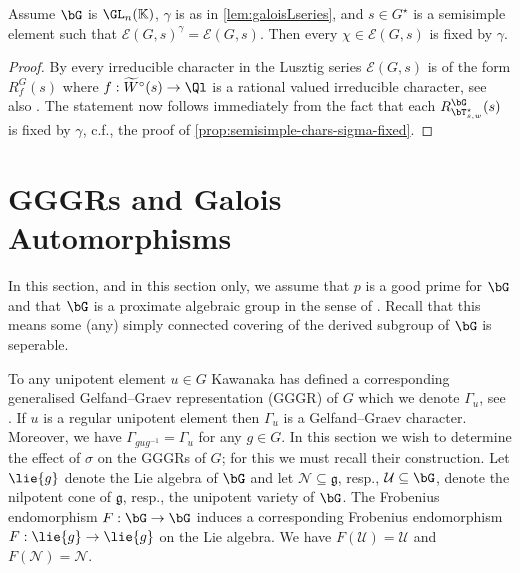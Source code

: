\documentclass[eqthmnum, nocolour]{jt-calcs}
\begin{document}
\begin{prop}\label{prop:GLn-sigma-fixed}
Assume $\bG$ is $\GL_n(\mathbb{K})$, $\gamma$ is as in \cref{lem:galoisLseries}, and $s \in G^{\star}$ is a semisimple element such that $\mathcal{E}(G,s)^{\gamma} = \mathcal{E}(G,s)$.  Then every $\chi \in \mathcal{E}(G,s)$ is fixed by $\gamma$.
\end{prop}

\begin{proof}
By \cite[3.2, 4.23]{lusztig:1984:characters-of-reductive-groups} every irreducible character in the Lusztig series $\mathcal{E}(G,s)$ is of the form $R^G_f(s)$ where $f : \widetilde{W}^{\circ}(s) \to \Ql$ is a rational valued irreducible character, see also \cite[13.25(ii), \S15.4]{digne-michel:1991:representations-of-finite-groups-of-lie-type}. The statement now follows immediately from the fact that each $R_{\bT_{s,w}^{\star}}^{\bG}(s)$ is fixed by $\gamma$, c.f., the proof of \cref{prop:semisimple-chars-sigma-fixed}.
\end{proof}

\section{GGGRs and Galois Automorphisms}\label{sec:GGGRs}
\begin{assumption}
In this section, and in this section only, we assume that $p$ is a good prime for $\bG$ and that $\bG$ is a proximate algebraic group in the sense of \cite[2.10]{taylor:2016:GGGRs-small-characteristics}. Recall that this means some (any) simply connected covering of the derived subgroup of $\bG$ is seperable.
\end{assumption}

\begin{pa}\label{pa:GGGR-rat-conj}
To any unipotent element $u \in G$ Kawanaka has defined a corresponding generalised Gelfand--Graev representation (GGGR) of $G$ which we denote $\Gamma_u$, see \cite{kawanaka:1985:GGGRs-and-ennola-duality,taylor:2016:GGGRs-small-characteristics}. If $u$ is a regular unipotent element then $\Gamma_u$ is a Gelfand--Graev character. Moreover, we have $\Gamma_{gug^{-1}} = \Gamma_u$ for any $g \in G$. In this section we wish to determine the effect of $\sigma$ on the GGGRs of $G$; for this we must recall their construction. Let $\lie{g}$ denote the Lie algebra of $\bG$ and let $\mathcal{N} \subseteq \mathfrak{g}$, resp., $\mathcal{U} \subseteq \bG$, denote the nilpotent cone of $\mathfrak{g}$, resp., the unipotent variety of $\bG$. The Frobenius endomorphism $F : \bG \to \bG$ induces a corresponding Frobenius endomorphism $F : \lie{g} \to \lie{g}$ on the Lie algebra. We have $F(\mathcal{U}) = \mathcal{U}$ and $F(\mathcal{N}) = \mathcal{N}$.
\end{pa}
\end{document}
